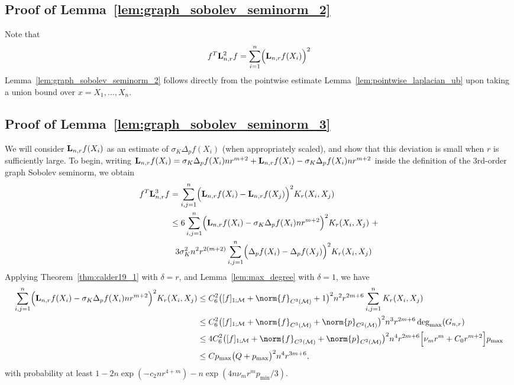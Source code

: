 \documentclass{article}
\newcommand{\1}{\mathbf{1}}
\newcommand{\Lap}{{\bf L}}
\newcommand{\mc}[1]{\mathcal{#1}}
\theoremstyle{alden}
\theoremstyle{aldenthm}
\theoremstyle{definition}
\theoremstyle{remark}
\begin{document}
\subsection{Proof of Lemma~\ref{lem:graph_sobolev_seminorm_2}}
Note that
\begin{equation*}
f^T \Lap_{n,r}^2 f = \sum_{i = 1}^{n} \Bigl(\Lap_{n,r}f(X_i)\Bigr)^2
\end{equation*}
Lemma~\ref{lem:graph_sobolev_seminorm_2} follows directly from the pointwise estimate Lemma~\ref{lem:pointwise_laplacian_ub} upon taking a union bound over $x = X_1,\ldots,X_n$.

\subsection{Proof of Lemma~\ref{lem:graph_sobolev_seminorm_3}}
We will consider $\Lap_{n,r}f(X_i)$ as an estimate of $\sigma_K \Delta_pf(X_i)$ (when appropriately scaled), and show that this deviation is small when $r$ is sufficiently large.  To begin, writing $\Lap_{n,r}f(X_i) = \sigma_{K}\Delta_{p}f(X_i)nr^{m + 2} + \Lap_{n,r}f(X_i) - \sigma_{K}\Delta_{p}f(X_i)nr^{m+2}$ inside the definition of the 3rd-order graph Sobolev seminorm, we obtain
\begin{align*}
f^T \Lap_{n,r}^3 f & = \sum_{i,j = 1}^{n} \Bigl(\Lap_{n,r}f(X_i) - \Lap_{n,r}f(X_j)\Bigr)^2 K_r(X_i,X_j) \\
& \leq 6 \sum_{i,j = 1}^{n} \Bigl(\Lap_{n,r}f(X_i) - \sigma_{K}\Delta_{p}f(X_i)nr^{m+2}\Bigr)^2 K_r(X_i,X_j)~+ \\
&~~3 \sigma_K^2 n^2 r^{2(m + 2)} \sum_{i,j = 1}^{n} \Bigl(\Delta_pf(X_i) - \Delta_pf(X_j)\Bigr)^2 K_r(X_i,X_j)
\end{align*}
Applying Theorem~\ref{thm:calder19_1} with $\delta = r$, and Lemma~\ref{lem:max_degree} with $\delta = 1$, we have
\begin{align*}
\sum_{i,j = 1}^{n} \Bigl(\Lap_{n,r}f(X_i) - \sigma_{K}\Delta_{p}f(X_i)nr^{m+2}\Bigr)^2  K_r(X_i,X_j) & \leq  C_6^2 \bigl([f]_{1;\mc{M}} + \norm{f}_{C^3(\mc{M})} + 1\bigr)^2 n^2r^{2m + 6} \sum_{i,j = 1}^{n} K_r(X_i,X_j) \\
& \leq  C_6^2 \bigl([f]_{1;\mc{M}} + \norm{f}_{C^3(\mc{M})} + \norm{p}_{C^2(\mc{M})}\bigr)^2 n^3r^{2m + 6} \deg_{\max}(G_{n,r}) \\
& \leq 4 C_6^2 \bigl([f]_{1;\mc{M}} + \norm{f}_{C^3(\mc{M})} + \norm{p}_{C^2(\mc{M})}\bigr)^2 n^4 r^{2m + 6} \Bigl[\nu_mr^m + C_0r^{m + 2}\Bigr] p_{\max} \\
& \leq C p_{\max}\bigl(Q + p_{\max}\bigr)^2n^4 r^{3m + 6},
\end{align*}
with probability at least $1 - 2n\exp(-c_2nr^{4 + m}) - n\exp(4 n\nu_mr^mp_{\min}/3)$. 
\end{document}

